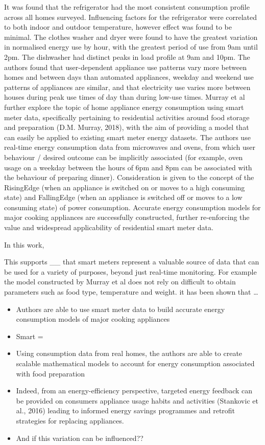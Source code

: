 \documentclass[11pt,]{article}
\providecommand{\tightlist}{%
  \setlength{\itemsep}{0pt}\setlength{\parskip}{0pt}}
\begin{document}
It was found that the refrigerator had the most consistent consumption
profile across all homes surveyed. Influencing factors for the
refrigerator were correlated to both indoor and outdoor temperature,
however effect was found to be minimal. The clothes washer and dryer
were found to have the greatest variation in normalised energy use by
hour, with the greatest period of use from 9am until 2pm. The dishwasher
had distinct peaks in load profile at 9am and 10pm. The authors found
that user-dependent appliance use patterns vary more between homes and
between days than automated appliances, weekday and weekend use patterns
of appliances are similar, and that electricity use varies more between
houses during peak use times of day than during low-use times. Murray et
al further explore the topic of home appliance energy consumption using
smart meter data, specifically pertaining to residential activities
around food storage and preparation (D.M. Murray, 2018), with the aim of
providing a model that can easily be applied to existing smart meter
energy datasets. The authors use real-time energy consumption data from
microwaves and ovens, from which user behaviour / desired outcome can be
implicitly associated (for example, oven usage on a weekday between the
hours of 6pm and 8pm can be associated with the behaviour of preparing
dinner). Consideration is given to the concept of the RisingEdge (when
an appliance is switched on or moves to a high consuming state) and
FallingEdge (when an appliance is switched off or moves to a low
consuming state) of power consumption. Accurate energy consumption
models for major cooking appliances are successfully constructed,
further re-enforcing the value and widespread applicability of
residential smart meter data.

In this work,

This supports \_\_ that smart meters represent a valuable source of data
that can be used for a variety of purposes, beyond just real-time
monitoring. For example the model constructed by Murray et al does not
rely on difficult to obtain parameters such as food type, temperature
and weight. it has been shown that \ldots{}

\begin{itemize}
\tightlist
\item
  Authors are able to use smart meter data to build accurate energy
  consumption models of major cooking appliances
\item
  Smart =
\item
  Using consumption data from real homes, the authors are able to create
  scalable mathematical models to account for energy consumption
  associated with food preparation
\item
  Indeed, from an energy-efficiency perspective, targeted energy
  feedback can be provided on consumers appliance usage habits and
  activities (Stankovic et al., 2016) leading to informed energy savings
  programmes and retrofit strategies for replacing appliances.
\item
  And if this variation can be influenced??
\end{itemize}
\end{document}
